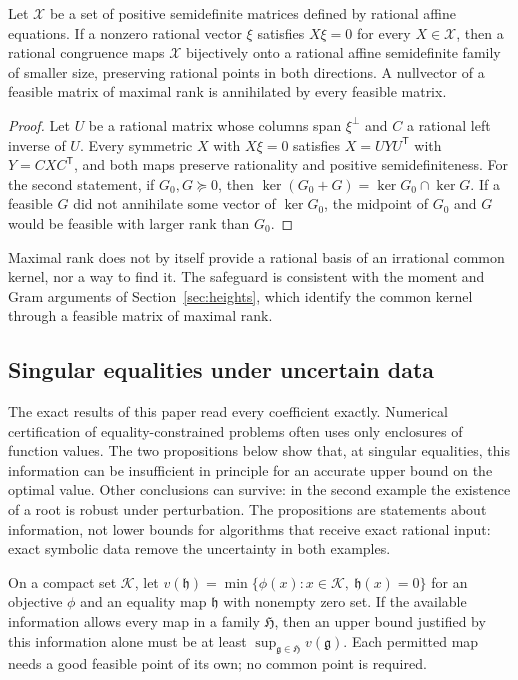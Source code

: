 \begin{lemma}
\label{lem:bnd-common-kernel}
Let $\mathcal X$ be a set of positive semidefinite matrices defined by
rational affine equations. If a nonzero rational vector $\xi$ satisfies
$X\xi=0$ for every $X\in\mathcal X$, then a rational congruence maps
$\mathcal X$ bijectively onto a rational affine semidefinite family of smaller
size, preserving rational points in both directions. A nullvector of a
feasible matrix of maximal rank is annihilated by every feasible matrix.
\end{lemma}

\begin{proof}
Let $U$ be a rational matrix whose columns span $\xi^\perp$ and $C$ a rational
left inverse of $U$. Every symmetric $X$ with $X\xi=0$ satisfies
$X=UYU^{\mathsf T}$ with $Y=CXC^{\mathsf T}$, and both maps preserve
rationality and positive semidefiniteness. For the second statement, if
$G_0,G\succeq0$, then $\ker(G_0+G)=\ker G_0\cap\ker G$. If a feasible $G$ did
not annihilate some vector of $\ker G_0$, the midpoint of $G_0$ and $G$ would
be feasible with larger rank than $G_0$.
\end{proof}

Maximal rank does not by itself provide a rational basis of an irrational
common kernel, nor a way to find it. The safeguard is consistent with the
moment and Gram arguments of Section~\ref{sec:heights}, which identify the
common kernel through a feasible matrix of maximal rank.

\subsection{Singular equalities under uncertain data}
\label{app:bnd-uncertain}

The exact results of this paper read every coefficient exactly. Numerical
certification of equality-constrained problems often uses only enclosures of
function values. The two propositions below show that, at singular
equalities, this information can be insufficient in principle for an
accurate upper bound on the optimal value. Other conclusions can survive: in
the second example the existence of a root is robust under perturbation.
The propositions are statements about information, not lower bounds for
algorithms that receive exact rational input: exact symbolic data remove the
uncertainty in both examples.

On a compact set $\mathcal K$, let
$v(\mathfrak h)=\min\{\phi(x):x\in\mathcal K,\ \mathfrak h(x)=0\}$ for an
objective $\phi$ and an equality map $\mathfrak h$ with nonempty zero set. If
the available information allows every map in a family $\mathfrak H$, then an
upper bound justified by this information alone must be at least
$\sup_{\mathfrak g\in\mathfrak H}v(\mathfrak g)$. Each permitted map needs a
good feasible point of its own; no common point is required.

